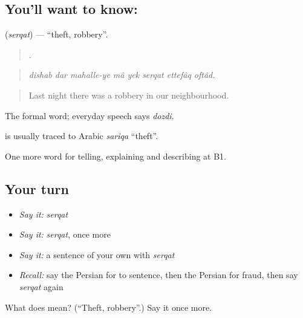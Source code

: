 \subsection*{You'll want to know: }
\textbf{} (\emph{serqat}) — \textquotedblleft{}theft, robbery\textquotedblright{}.

\begin{quote}
       .
\end{quote}

\begin{quote}
\emph{dishab dar mahalle-ye mâ yek serqat ettefâq oftâd.}
\end{quote}

\begin{quote}
Last night there was a robbery in our neighbourhood.
\end{quote}

The formal word; everyday speech says \emph{dozdi}.

\begin{cousinweb}
\textbf{} is usually traced to Arabic \emph{sariqa} \textquotedblleft{}theft\textquotedblright{}.
\end{cousinweb}

\begin{grammarlens}[title={What you've built}]
One more word for telling, explaining and describing at B1.
\end{grammarlens}

\subsection*{Your turn}
\begin{itemize}
\raggedright
  \item \emph{Say it:} \emph{serqat}
  \item \emph{Say it:} \emph{serqat}, once more
  \item \emph{Say it:} a sentence of your own with \emph{serqat}
  \item \emph{Recall:} say the Persian for to sentence, then the Persian for fraud, then say \emph{serqat} again
\end{itemize}

\begin{tcolorbox}[breakable,colback=teal!4,colframe=teal!35!black,title={Before you move on}]
What does  mean? (\textquotedblleft{}Theft, robbery\textquotedblright{}.) Say it once more.
\end{tcolorbox}
